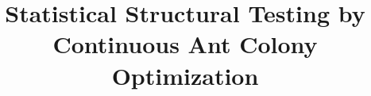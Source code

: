 \documentclass[journal]{IEEEtran}
\begin{document}
%
\title{Statistical Structural Testing by Continuous Ant Colony Optimization}
%
%
%


% 
%



% 
\end{document}
